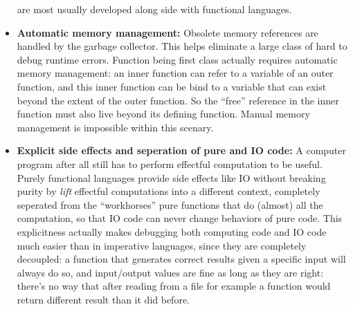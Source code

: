 \documentclass[../gr-final.tex]{subfiles}
\begin{document}
\begin{itemize}
               are most usually developed along side with
               functional languages. 
       \item {\bfseries Automatic memory management: } Obsolete
               memory references are handled by the garbage
               collector. This helps eliminate a large class of
               hard to debug runtime errors. Function being first
               class actually requires automatic memory
               management: an inner function can refer to a
               variable of an outer function, and this inner
               function can be bind to a variable that can exist
               beyond the extent of the outer function. So the
               ``free'' reference in the inner function must also live
               beyond its defining function. Manual memory
               management is impossible within this scenary.
       \item {\bfseries Explicit side effects and seperation of
               pure and IO code: } A computer program after all
               still has to perform effectful computation to be
               useful. Purely functional languages provide side
               effects like IO without breaking purity by {\it
               lift} effectful computations into a different
               context, completely seperated from the
               ``workhorses'' pure functions that do (almost) all
               the computation, so that IO code can never change
               behaviors of pure code. This explicitness actually
               makes debugging both computing code and IO code much 
               easier than in imperative languages, since they
               are completely decoupled: a function that
               generates correct results given a specific input
               will always do so, and input/output values are fine as
               long as they are right: there's no way that after reading
               from a file for example a function would return different 
               result than it did before.
\end{itemize}                
\end{document}
